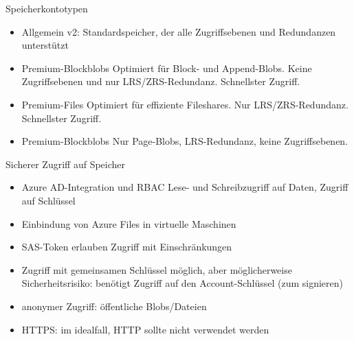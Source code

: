 \begin{flashcard}[Definition]{Speicherkontotypen}
  \begin{itemize}
    \item Allgemein v2:\newline
      Standardspeicher, der alle Zugriffsebenen und Redundanzen unterstützt
    \item Premium-Blockblobs\newline
      Optimiert für Block- und Append-Blobs. Keine Zugriffsebenen und nur LRS/ZRS-Redundanz. Schnellster Zugriff.
    \item Premium-Files\newline
      Optimiert für effiziente Fileshares. Nur LRS/ZRS-Redundanz. Schnellster Zugriff.
    \item Premium-Blockblobs\newline
      Nur Page-Blobs, LRS-Redundanz, keine Zugriffsebenen.
  \end{itemize}
\end{flashcard}

\begin{flashcard}[Definition]{Sicherer Zugriff auf Speicher}
  \begin{itemize}
    \item Azure AD-Integration und RBAC\newline
      Lese- und Schreibzugriff auf Daten, Zugriff auf Schlüssel
    \item Einbindung von Azure Files in virtuelle Maschinen
    \item SAS-Token erlauben Zugriff mit Einschränkungen
    \item Zugriff mit gemeinsamen Schlüssel möglich, aber möglicherweise Sicherheitsrisiko:\newline
      benötigt Zugriff auf den Account-Schlüssel (zum signieren)
    \item anonymer Zugriff: öffentliche Blobs/Dateien
    \item HTTPS: im idealfall, HTTP sollte nicht verwendet werden
  \end{itemize}
\end{flashcard}

